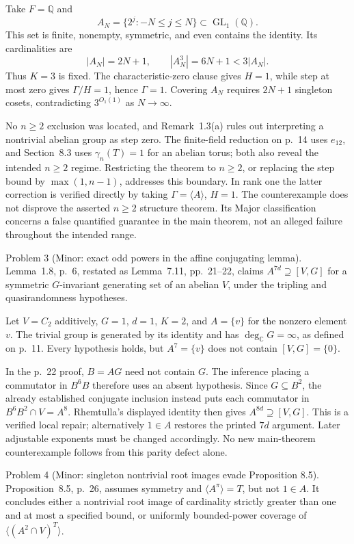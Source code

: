 \documentclass[10pt]{article}
\begin{document}
Take \(F=\mathbb Q\) and \[A_N=\{2^j:-N\le j\le N\}\subset\operatorname{GL}_1(\mathbb Q).\] This set is finite, nonempty, symmetric, and even contains the identity. Its cardinalities are \[|A_N|=2N+1,\qquad |A_N^3|=6N+1<3|A_N|.\] Thus \(K=3\) is fixed. The characteristic-zero clause gives \(H=1\), while step at most zero gives \(\Gamma/H=1\), hence \(\Gamma=1\). Covering \(A_N\) requires \(2N+1\) singleton cosets, contradicting \(3^{O_1(1)}\) as \(N\to\infty\).\par
No \(n\ge2\) exclusion was located, and Remark 1.3(a) rules out interpreting a nontrivial abelian group as step zero. The finite-field reduction on p. 14 uses \(e_{12}\), and Section 8.3 uses \(\gamma_n(T)=1\) for an abelian torus; both also reveal the intended \(n\ge2\) regime. Restricting the theorem to \(n\ge2\), or replacing the step bound by \(\max(1,n-1)\), addresses this boundary. In rank one the latter correction is verified directly by taking \(\Gamma=\langle A\rangle\), \(H=1\). The counterexample does not disprove the asserted \(n\ge2\) structure theorem. Its Major classification concerns a false quantified guarantee in the main theorem, not an alleged failure throughout the intended range.\par
Problem 3 (Minor: exact odd powers in the affine conjugating lemma).  Lemma 1.8, p. 6, restated as Lemma 7.11, pp. 21–22, claims \(A^{7d}\supseteq[V,G]\) for a symmetric \(G\)-invariant generating set of an abelian \(V\), under the tripling and quasirandomness hypotheses.\par
Let \(V=C_2\) additively, \(G=1\), \(d=1\), \(K=2\), and \(A=\{v\}\) for the nonzero element \(v\). The trivial group is generated by its identity and has \(\deg_{\mathbb C}G=\infty\), as defined on p. 11. Every hypothesis holds, but \(A^7=\{v\}\) does not contain \([V,G]=\{0\}\).\par
In the p. 22 proof, \(B=AG\) need not contain \(G\). The inference placing a commutator in \(B^6B\) therefore uses an absent hypothesis. Since \(G\subseteq B^2\), the already established conjugate inclusion instead puts each commutator in \(B^6B^2\cap V=A^8\). Rhemtulla’s displayed identity then gives \(A^{8d}\supseteq[V,G]\). This is a verified local repair; alternatively \(1\in A\) restores the printed \(7d\) argument. Later adjustable exponents must be changed accordingly. No new main-theorem counterexample follows from this parity defect alone.\par
Problem 4 (Minor: singleton nontrivial root images evade Proposition 8.5).  Proposition 8.5, p. 26, assumes symmetry and \(\langle A^\pi\rangle=T\), but not \(1\in A\). It concludes either a nontrivial root image of cardinality strictly greater than one and at most a specified bound, or uniformly bounded-power coverage of \(\langle(A^2\cap V)^T\rangle\).\par
\end{document}
